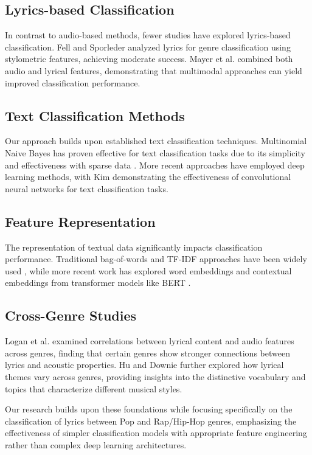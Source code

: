 \documentclass[conference]{IEEEtran}
\begin{document}
\subsection{Lyrics-based Classification}
In contrast to audio-based methods, fewer studies have explored lyrics-based classification. Fell and Sporleder \cite{fell2014lyrics} analyzed lyrics for genre classification using stylometric features, achieving moderate success. Mayer et al. \cite{mayer2008rhyme} combined both audio and lyrical features, demonstrating that multimodal approaches can yield improved classification performance.

\subsection{Text Classification Methods}
Our approach builds upon established text classification techniques. Multinomial Naive Bayes has proven effective for text classification tasks due to its simplicity and effectiveness with sparse data \cite{mccallum1998comparison}. More recent approaches have employed deep learning methods, with Kim \cite{kim2014convolutional} demonstrating the effectiveness of convolutional neural networks for text classification tasks.

\subsection{Feature Representation}
The representation of textual data significantly impacts classification performance. Traditional bag-of-words and TF-IDF approaches have been widely used \cite{sebastiani2002machine}, while more recent work has explored word embeddings \cite{mikolov2013distributed} and contextual embeddings from transformer models like BERT \cite{devlin2018bert}.

\subsection{Cross-Genre Studies}
Logan et al. \cite{logan2004semantic} examined correlations between lyrical content and audio features across genres, finding that certain genres show stronger connections between lyrics and acoustic properties. Hu and Downie \cite{hu2010improving} further explored how lyrical themes vary across genres, providing insights into the distinctive vocabulary and topics that characterize different musical styles.

Our research builds upon these foundations while focusing specifically on the classification of lyrics between Pop and Rap/Hip-Hop genres, emphasizing the effectiveness of simpler classification models with appropriate feature engineering rather than complex deep learning architectures.
\end{document}
